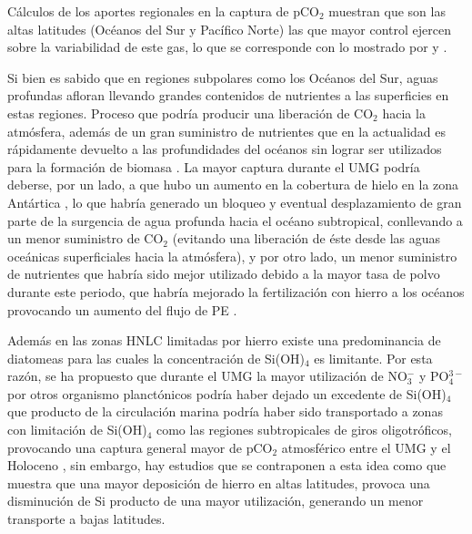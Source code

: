 Cálculos de los aportes regionales en la captura de pCO$_2$ muestran que son las altas latitudes (Océanos del Sur y Pacífico Norte) las que mayor control ejercen sobre la variabilidad de este gas, lo que se corresponde con lo mostrado por \cite{lambert2015dust} y \cite{bopp2003dust}. 

Si bien es sabido que en regiones subpolares como los Océanos del Sur, aguas profundas afloran llevando grandes contenidos de nutrientes a las superficies en estas regiones. Proceso que podría producir una liberación de CO$_2$ hacia la atmósfera, además de un gran suministro de nutrientes que en la actualidad es rápidamente devuelto a las profundidades del océanos sin lograr ser utilizados para la formación de biomasa \citep{hain2010carbon}. La mayor captura durante el UMG podría deberse, por un lado, a que hubo un aumento en la cobertura de hielo en la zona Antártica \citep{ferrari2014antarctic}, lo que habría generado un bloqueo y eventual desplazamiento de gran parte de la surgencia de agua profunda hacia el océano subtropical, conllevando a un menor suministro de CO$_2$ (evitando una liberación de éste desde las aguas oceánicas superficiales hacia la atmósfera), y por otro lado, un menor suministro de nutrientes \citep{tagliabue2009quantifying} que habría sido mejor utilizado debido a la mayor tasa de polvo durante este periodo, que habría mejorado la fertilización con hierro a los océanos provocando un aumento del flujo de PE \citep{martin1990glacial,toggweiler2006midlatitude,shaffer2018and}. 

 Además en las zonas HNLC limitadas por hierro existe una predominancia de diatomeas \citep{bopp2003dust,arellano2011high} para las cuales la concentración de Si(OH)$_4$ es limitante. Por esta razón, se ha propuesto que durante el UMG la mayor utilización de NO$_{3}^{-}$ y PO$_{4}^{3-}$ por otros organismo planctónicos podría haber dejado un excedente de Si(OH)$_4$ que producto de la circulación marina podría haber sido transportado a zonas con limitación de Si(OH)$_4$ como las regiones subtropicales de giros oligotróficos, provocando una captura general mayor de pCO$_2$ atmosférico entre el UMG y el Holoceno \citep{matsumoto2002silicic}, sin embargo, hay estudios que se contraponen a esta idea como \cite{tagliabue2014impact} que muestra que una mayor deposición de hierro en altas latitudes, provoca una disminución de Si producto de una mayor utilización, generando un menor transporte a bajas latitudes. 

